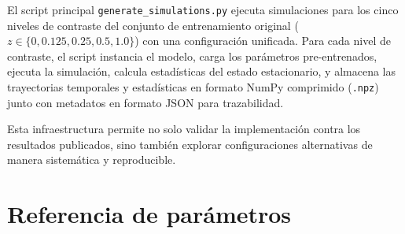 



El script principal \texttt{generate\_simulations.py} ejecuta simulaciones para los cinco niveles de contraste del conjunto de entrenamiento original ($z \in \{0,\allowbreak 0.125,\allowbreak 0.25,\allowbreak 0.5,\allowbreak 1.0\}$) con una configuración unificada. Para cada nivel de contraste, el script instancia el modelo, carga los parámetros pre-entrenados, ejecuta la simulación, calcula estadísticas del estado estacionario, y almacena las trayectorias temporales y estadísticas en formato NumPy comprimido (\texttt{.npz}) junto con metadatos en formato JSON para trazabilidad.

Esta infraestructura permite no solo validar la implementación contra los resultados publicados, sino también explorar configuraciones alternativas de manera sistemática y reproducible.


\section{Referencia de parámetros}
\label{sec:impl_parametros}

